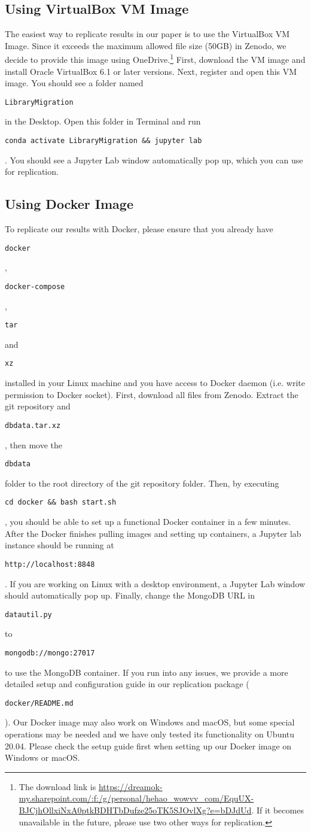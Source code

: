 \documentclass[sigconf]{acmart}
\newcommand{\Code}[1]{\begin{small}\texttt{#1}\end{small}}
\begin{document}
\subsection{Using VirtualBox VM Image}
\label{sec:vm}
The easiest way to replicate results in our paper is to use the VirtualBox VM Image. 
Since it exceeds the maximum allowed file size (50GB) in Zenodo, we decide to provide this image using OneDrive.\footnote{The download link is \url{https://dreamok-my.sharepoint.com/:f:/g/personal/hehao_wowvv_com/EquUX-BJCjhOllxiNxA0ptkBDHTbDufze25oTK5SJOvlXg?e=bDJdUd}. If it becomes unavailable in the future, please use two other ways for replication.}
First, download the VM image and install Oracle VirtualBox 6.1 or later versions.
Next, register and open this VM image.
You should see a folder named \Code{LibraryMigration} in the Desktop.
Open this folder in Terminal and run \Code{conda activate LibraryMigration \&\& jupyter lab}.
You should see a Jupyter Lab window automatically pop up, which you can use for replication.

\subsection{Using Docker Image}
\label{sec:docker}

To replicate our results with Docker, please ensure that you already have \Code{docker}, \Code{docker-compose}, \Code{tar} and \Code{xz} installed in your Linux machine and you have access to Docker daemon (i.e. write permission to Docker socket).
First, download all files from Zenodo. 
Extract the git repository and \Code{dbdata.tar.xz}, then move the \Code{dbdata} folder to the root directory of the git repository folder.
Then, by executing \Code{cd docker \&\& bash start.sh}, you should be able to set up a functional Docker container in a few minutes.
After the Docker finishes pulling images and setting up containers, a Jupyter lab instance should be running at \Code{http://localhost:8848}. 
If you are working on Linux with a desktop environment, a Jupyter Lab window should automatically pop up.
Finally, change the MongoDB URL in \Code{datautil.py} to \Code{mongodb://mongo:27017} to use the MongoDB container.
If you run into any issues, we provide a more detailed setup and configuration guide in our replication package (\Code{docker/README.md}). 
Our Docker image may also work on Windows and macOS, but some special operations may be needed and we have only tested its functionality on Ubuntu 20.04.
Please check the setup guide first when setting up our Docker image on Windows or macOS.
\end{document}
